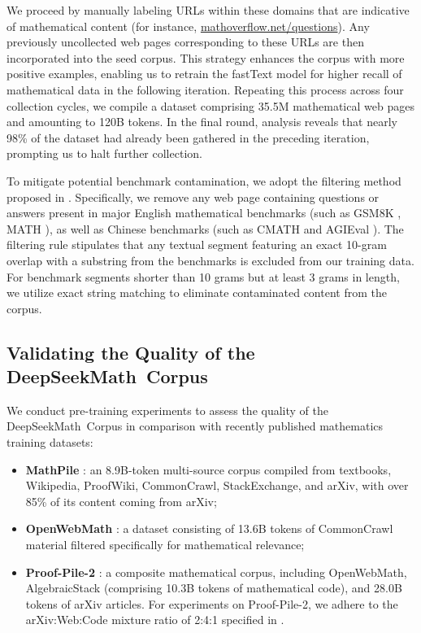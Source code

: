 We proceed by manually labeling URLs within these domains that are indicative of mathematical content (for instance, \url{mathoverflow.net/questions}). Any previously uncollected web pages corresponding to these URLs are then incorporated into the seed corpus. This strategy enhances the corpus with more positive examples, enabling us to retrain the fastText model for higher recall of mathematical data in the following iteration. Repeating this process across four collection cycles, we compile a dataset comprising 35.5M mathematical web pages and amounting to 120B tokens. In the final round, analysis reveals that nearly 98\% of the dataset had already been gathered in the preceding iteration, prompting us to halt further collection.

To mitigate potential benchmark contamination, we adopt the filtering method proposed in \cite{deepseek-coder}. Specifically, we remove any web page containing questions or answers present in major English mathematical benchmarks (such as GSM8K \citep{gsm8k}, MATH \citep{MATH}), as well as Chinese benchmarks (such as CMATH \citep{wei2023cmath} and AGIEval \citep{agieval}). The filtering rule stipulates that any textual segment featuring an exact 10-gram overlap with a substring from the benchmarks is excluded from our training data. For benchmark segments shorter than 10 grams but at least 3 grams in length, we utilize exact string matching to eliminate contaminated content from the corpus.

\subsection{Validating the Quality of the DeepSeekMath~Corpus}

We conduct pre-training experiments to assess the quality of the DeepSeekMath~Corpus in comparison with recently published mathematics training datasets:

\begin{itemize}[topsep=0pt]
    \item \textbf{MathPile} \citep{mathpile}: an 8.9B-token multi-source corpus compiled from textbooks, Wikipedia, ProofWiki, CommonCrawl, StackExchange, and arXiv, with over 85\% of its content coming from arXiv;
    \item \textbf{OpenWebMath} \citep{openwebmath}: a dataset consisting of 13.6B tokens of CommonCrawl material filtered specifically for mathematical relevance;
    \item \textbf{Proof-Pile-2} \citep{llemma}: a composite mathematical corpus, including OpenWebMath, AlgebraicStack (comprising 10.3B tokens of mathematical code), and 28.0B tokens of arXiv articles. For experiments on Proof-Pile-2, we adhere to the arXiv:Web:Code mixture ratio of 2:4:1 specified in \cite{llemma}.
\end{itemize}

